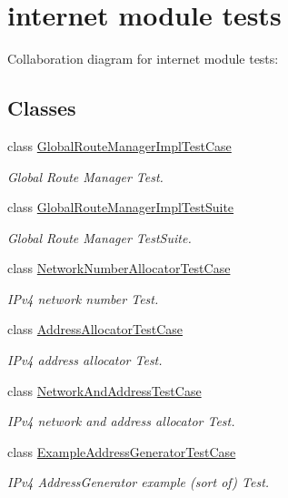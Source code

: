 \hypertarget{group__internet-test}{}\section{internet module tests}
\label{group__internet-test}
Collaboration diagram for internet module tests\+:
\subsection*{Classes}
\begin{DoxyCompactItemize}
\item 
class \hyperlink{classGlobalRouteManagerImplTestCase}{Global\+Route\+Manager\+Impl\+Test\+Case}
\begin{DoxyCompactList}\small\item\em Global Route Manager Test. \end{DoxyCompactList}\item 
class \hyperlink{classGlobalRouteManagerImplTestSuite}{Global\+Route\+Manager\+Impl\+Test\+Suite}
\begin{DoxyCompactList}\small\item\em Global Route Manager Test\+Suite. \end{DoxyCompactList}\item 
class \hyperlink{classNetworkNumberAllocatorTestCase}{Network\+Number\+Allocator\+Test\+Case}
\begin{DoxyCompactList}\small\item\em I\+Pv4 network number Test. \end{DoxyCompactList}\item 
class \hyperlink{classAddressAllocatorTestCase}{Address\+Allocator\+Test\+Case}
\begin{DoxyCompactList}\small\item\em I\+Pv4 address allocator Test. \end{DoxyCompactList}\item 
class \hyperlink{classNetworkAndAddressTestCase}{Network\+And\+Address\+Test\+Case}
\begin{DoxyCompactList}\small\item\em I\+Pv4 network and address allocator Test. \end{DoxyCompactList}\item 
class \hyperlink{classExampleAddressGeneratorTestCase}{Example\+Address\+Generator\+Test\+Case}
\begin{DoxyCompactList}\small\item\em I\+Pv4 Address\+Generator example (sort of) Test. \end{DoxyCompactList}\item 

\end{DoxyCompactItemize}
